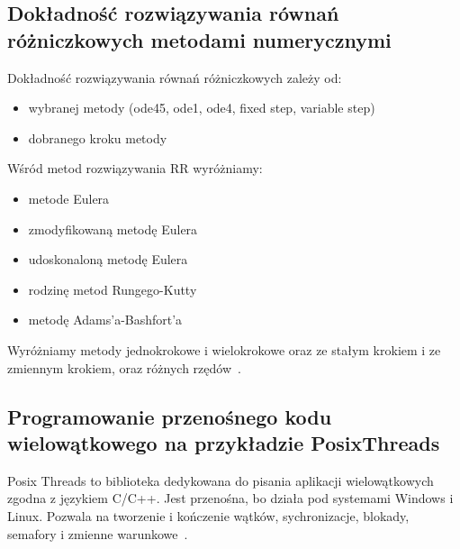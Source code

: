 \documentclass[wi]{zut}
\begin{document}

\subsection{Dokładność rozwiązywania równań różniczkowych metodami numerycznymi}

Dokładność rozwiązywania równań różniczkowych zależy od:

\begin{itemize}
    \item wybranej metody (ode45, ode1, ode4, fixed step, variable step)
    \item dobranego kroku metody
\end{itemize}
\question

Wśród metod rozwiązywania RR wyróżniamy:
\begin{itemize}
    \item metode Eulera
    \item zmodyfikowaną metodę Eulera
    \item udoskonaloną metodę Eulera
    \item rodzinę metod Rungego-Kutty
    \item metodę Adams'a-Bashfort'a
\end{itemize}

Wyróżniamy metody jednokrokowe i wielokrokowe oraz ze stałym krokiem i ze zmiennym krokiem, oraz różnych rzędów~\cite{Piela_RR}.


\subsection{Programowanie przenośnego kodu wielowątkowego na przykładzie PosixThreads}

Posix Threads to biblioteka dedykowana do pisania aplikacji wielowątkowych zgodna z językiem C/C++. Jest przenośna, bo działa pod systemami Windows i Linux. Pozwala na tworzenie i kończenie wątków, sychronizacje, blokady, semafory i zmienne warunkowe~\cite{Palkowski_POSIX}.
\end{document}
